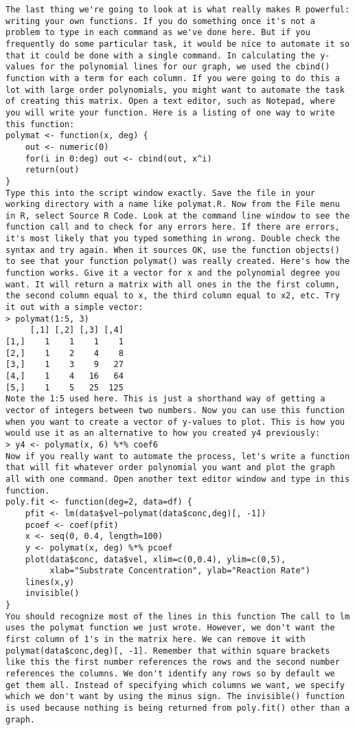 {\begin{framed}
\begin{verbatim}
The last thing we're going to look at is what really makes R powerful: writing your own functions. If you do something once it's not a problem to type in each command as we've done here. But if you frequently do some particular task, it would be nice to automate it so that it could be done with a single command. In calculating the y-values for the polynomial lines for our graph, we used the cbind() function with a term for each column. If you were going to do this a lot with large order polynomials, you might want to automate the task of creating this matrix. Open a text editor, such as Notepad, where you will write your function. Here is a listing of one way to write this function: 
polymat <- function(x, deg) {
    out <- numeric(0)
    for(i in 0:deg) out <- cbind(out, x^i)
    return(out)
}
Type this into the script window exactly. Save the file in your working directory with a name like polymat.R. Now from the File menu in R, select Source R Code. Look at the command line window to see the function call and to check for any errors here. If there are errors, it's most likely that you typed something in wrong. Double check the syntax and try again. When it sources OK, use the function objects() to see that your function polymat() was really created. Here's how the function works. Give it a vector for x and the polynomial degree you want. It will return a matrix with all ones in the the first column, the second column equal to x, the third column equal to x2, etc. Try it out with a simple vector: 
> polymat(1:5, 3)
     [,1] [,2] [,3] [,4] 
[1,]    1    1    1    1
[2,]    1    2    4    8
[3,]    1    3    9   27
[4,]    1    4   16   64
[5,]    1    5   25  125
Note the 1:5 used here. This is just a shorthand way of getting a vector of integers between two numbers. Now you can use this function when you want to create a vector of y-values to plot. This is how you would use it as an alternative to how you created y4 previously: 
> y4 <- polymat(x, 6) %*% coef6
Now if you really want to automate the process, let's write a function that will fit whatever order polynomial you want and plot the graph all with one command. Open another text editor window and type in this function. 
poly.fit <- function(deg=2, data=df) {
    pfit <- lm(data$vel~polymat(data$conc,deg)[, -1])
    pcoef <- coef(pfit)
    x <- seq(0, 0.4, length=100)
    y <- polymat(x, deg) %*% pcoef
    plot(data$conc, data$vel, xlim=c(0,0.4), ylim=c(0,5),
         xlab="Substrate Concentration", ylab="Reaction Rate")
    lines(x,y)
    invisible()
}
You should recognize most of the lines in this function The call to lm uses the polymat function we just wrote. However, we don't want the first column of 1's in the matrix here. We can remove it with polymat(data$conc,deg)[, -1]. Remember that within square brackets like this the first number references the rows and the second number references the columns. We don't identify any rows so by default we get them all. Instead of specifying which columns we want, we specify which we don't want by using the minus sign. The invisible() function is used because nothing is being returned from poly.fit() other than a graph. 

\end{verbatim}
\end{framed}}
